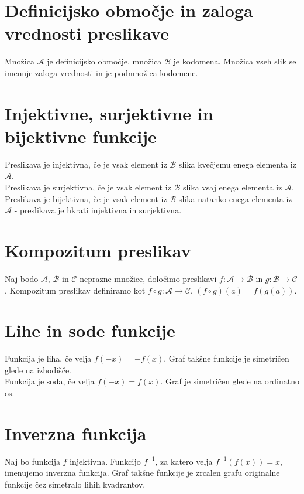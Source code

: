 \documentclass[12pt]{report}
\begin{document}
\section*{Definicijsko območje in zaloga vrednosti preslikave}
Množica $ \mathcal{A}$ je definicijsko območje, množica $ \mathcal{B}$ je kodomena.
Množica vseh slik se imenuje zaloga vrednosti in je podmnožica kodomene.

\section*{Injektivne, surjektivne in bijektivne funkcije}
Preslikava je injektivna, če je vsak element iz $ \mathcal{B}$ slika kvečjemu enega elementa iz $ \mathcal{A}$. \\
\bigbreak
Preslikava je surjektivna, če je vsak element iz $ \mathcal{B}$ slika vsaj enega elementa iz $ \mathcal{A}$. \\
\bigbreak
Preslikava je bijektivna, če je vsak element iz $ \mathcal{B}$ slika natanko enega elementa iz $ \mathcal{A}$ - preslikava je hkrati injektivna in surjektivna.

\section*{Kompozitum preslikav}
Naj bodo $ \mathcal{A}$, $ \mathcal{B}$ in $ \mathcal{C}$ neprazne množice, določimo preslikavi $f: \mathcal{A} \to \mathcal{B}$ in $g: \mathcal{B} \to \mathcal{C}$. Kompozitum preslikav definiramo kot $f \circ g: \mathcal{A} \to \mathcal{C}$, $(f \circ g)(a) = f(g(a))$.

\section*{Lihe in sode funkcije}
Funkcija je liha, če velja $f(-x) = -f(x)$. Graf takšne funkcije je simetričen glede na izhodišče.\\
\bigbreak
Funkcija je soda, če velja $f(-x) = f(x)$. Graf je simetričen glede na ordinatno os.

\section*{Inverzna funkcija}
Naj bo funkcija $f$ injektivna. Funkcijo $f^{-1}$, za katero velja $f^{-1}(f(x)) = x$, imenujemo inverzna funkcija. Graf takšne funkcije je zrcalen grafu originalne funkcije čez simetralo lihih kvadrantov.
\end{document}
